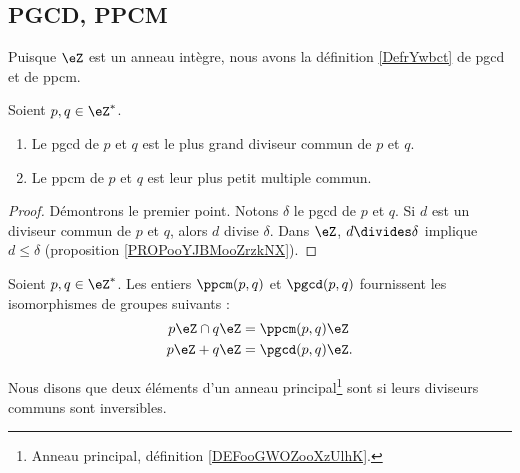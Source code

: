 \subsection{PGCD, PPCM}

Puisque \( \eZ\) est un anneau intègre, nous avons la définition \ref{DefrYwbct} de pgcd et de ppcm.
\begin{proposition}       \label{PROPooAVRGooUfhjwF}
	Soient \( p,q\in\eZ^*\).
	\begin{enumerate}
		\item
		      Le pgcd de \( p\) et \( q\) est le plus grand diviseur commun de \( p\) et \( q\).
		\item
		      Le ppcm de \( p\) et \( q\) est leur plus petit multiple commun.
	\end{enumerate}
\end{proposition}

\begin{proof}
	Démontrons le premier point. Notons \( \delta\) le pgcd de \( p\) et \( q\). Si \( d\) est un diviseur commun de \( p\) et \( q\), alors \( d\) divise \( \delta\). Dans \( \eZ\), \( d\divides \delta\) implique \( d\leq\delta\) (proposition \ref{PROPooYJBMooZrzkNX}).
\end{proof}

\begin{lemma}
	Soient \( p,q\in\eZ^*\). Les entiers \( \ppcm(p,q)\) et \( \pgcd(p,q)\) fournissent les isomorphismes de groupes suivants :
	\begin{subequations}
		\begin{align}
			p\eZ\cap q\eZ & =\ppcm(p,q)\eZ  \\
			p\eZ + q\eZ   & =\pgcd(p,q)\eZ.
		\end{align}
	\end{subequations}
\end{lemma}

\begin{definition}      \label{DEFooXSPFooPumQSy}
	Nous disons que deux éléments d'un anneau principal\footnote{Anneau principal, définition \ref{DEFooGWOZooXzUlhK}.} sont  si leurs diviseurs communs sont inversibles.
\end{definition}


